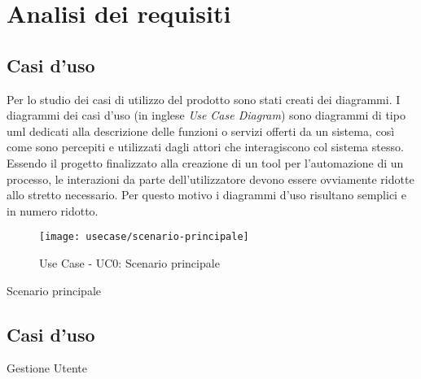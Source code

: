 \chapter{Analisi dei requisiti}
\label{cap:analisi-requisiti}

\section{Casi d'uso}

Per lo studio dei casi di utilizzo del prodotto sono stati creati dei diagrammi.
I diagrammi dei casi d'uso (in inglese \emph{Use Case Diagram}) sono diagrammi di tipo \gls{uml} dedicati alla descrizione delle funzioni o servizi offerti da un sistema, così come sono percepiti e utilizzati dagli attori che interagiscono col sistema stesso.
Essendo il progetto finalizzato alla creazione di un tool per l'automazione di un processo, le interazioni da parte dell'utilizzatore devono essere ovviamente ridotte allo stretto necessario. Per questo motivo i diagrammi d'uso risultano semplici e in numero ridotto.

\begin{figure}[ht] 
    \centering 
    \texttt{[image: usecase/scenario-principale]} 
    \caption{Use Case - UC0: Scenario principale}
\end{figure}

\begin{usecase}{0}{Scenario principale}
\label{uc:scenario-principale}
\end{usecase}

\section{Casi d'uso}
\begin{usecase}{1}{Gestione Utente}
\end{usecase}

